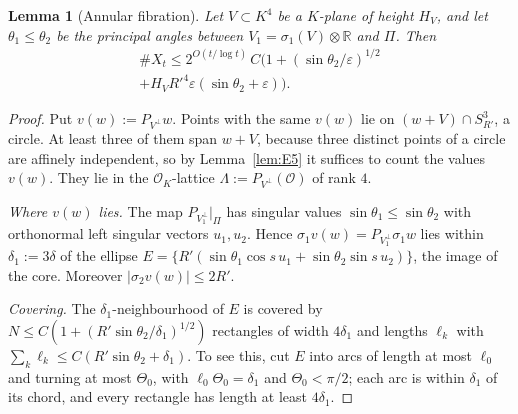 \documentclass[aps,prx,twocolumn,superscriptaddress,nofootinbib,longbibliography]{revtex4-2}
\theoremstyle{plain}
\newtheorem{lemma}{Lemma}
\theoremstyle{definition}
\theoremstyle{remark}
\newcommand{\R}{\mathbb{R}}
\begin{document}
\begin{lemma}[Annular fibration]\label{lem:G1}
Let $V\subset K^4$ be a $K$-plane of height $H_V$, and let $\theta_1\le\theta_2$ be the principal angles between
$V_1=\sigma_1(V)\otimes\R$ and $\Pi$. Then
\begin{multline*}
\#X_t\le2^{O(t/\log t)}\,C\big(1+(\sin\theta_2/\varepsilon)^{1/2}\\
+H_VR'^4\varepsilon(\sin\theta_2+\varepsilon)\big).
\end{multline*}
\end{lemma}
\begin{proof}
Put $v(w):=P_{V^\perp}w$. Points with the same $v(w)$ lie on $(w+V)\cap S^3_{R'}$, a circle. At least three of them span $w+V$, because
three distinct points of a circle are affinely independent, so by Lemma~\ref{lem:E5} it suffices to count the values $v(w)$. They lie in the $\mathcal O_K$-lattice
$\Lambda:=P_{V^\perp}(\mathcal O)$ of rank $4$.

\emph{Where $v(w)$ lies.} The map $P_{V_1^\perp}|_\Pi$ has singular values $\sin\theta_1\le\sin\theta_2$ with
orthonormal left singular vectors $u_1,u_2$. Hence $\sigma_1v(w)=P_{V_1^\perp}\sigma_1w$ lies within
$\delta_1:=3\delta$ of the ellipse $E=\{R'(\sin\theta_1\cos s\,u_1+\sin\theta_2\sin s\,u_2)\}$, the image of the
core. Moreover $|\sigma_2v(w)|\le2R'$.

\emph{Covering.} The $\delta_1$-neighbourhood of $E$ is covered by
$N\le C(1+(R'\sin\theta_2/\delta_1)^{1/2})$ rectangles of width $4\delta_1$ and lengths $\ell_k$ with
$\sum_k\ell_k\le C(R'\sin\theta_2+\delta_1)$. To see this, cut $E$ into arcs of length at most
$\ell_0$ and turning at most $\Theta_0$, with $\ell_0\Theta_0=\delta_1$ and $\Theta_0<\pi/2$; each arc is within $\delta_1$
of its chord, and every rectangle has length at least $4\delta_1$.


\end{proof}
\end{document}
